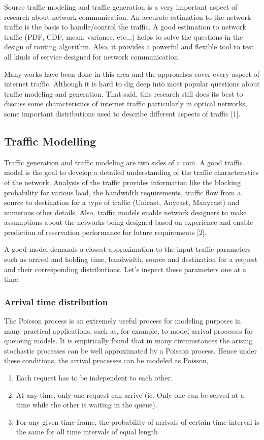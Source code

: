 Source traffic modeling and traffic generation is a very important aspect of research about network communication. An accurate estimation to the network traffic is the basis to handle/control the traffic. A good estimation to network traffic (PDF, CDF, mean, variance, etc..,) helps to solve the questions in the design of routing algorithm. Also, it provides a powerful and flexible tool to test all kinds of service designed for network communication. 

\indent Many works have been done in this area and the approaches cover every aspect of internet traffic. Although it is hard to dig deep into most popular questions about traffic modeling and generation. That said, this research still does its best to discuss some characteristics of internet traffic particularly in optical networks, some important distributions used to describe different aspects of traffic [1].

\subsection {Traffic Modelling}
Traffic generation and traffic modeling are two sides of a coin. A good traffic model is the goal to develop a detailed understanding of the traffic characteristics of the network. Analysis of the traffic provides information like the blocking probability for various load, the bandwidth requirements, traffic flow from a source to destination for a type of traffic (Unicast, Anycast, Manycast) and numerous other details. Also, traffic models enable network designers to make assumptions about the networks being designed based on experience and enable prediction of reservation performance for future requirements [2].

\indent A good model demands a closest approximation to the input traffic parameters such as arrival and holding time, bandwidth, source and destination for a request and their corresponding distributions. Let's inspect these parameters one at a time.

\subsubsection {Arrival time distribution}
The Poisson process is an extremely useful process for modeling purposes in many practical applications, such as, for example, to model arrival processes for queueing models. It is empirically found that in many circumstances the arising stochastic processes can be well approximated by a Poisson process. 
Hence under these conditions, the arrival processes can be modeled as Poisson,
\begin{enumerate} [leftmargin=*]
\item Each request has to be independent to each other.
\item At any time, only one request can arrive (ie. Only one can be served at a time while the other is waiting in the queue).
\item For any given time frame, the probability of arrivals of certain time interval is the same for all time intervals of equal length 
\end{enumerate}

